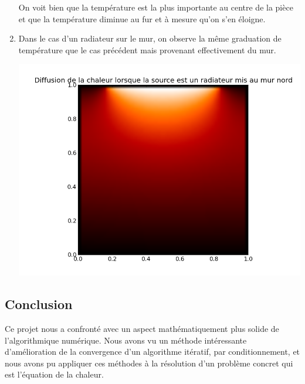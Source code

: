 \documentclass{article}
\begin{document}
\begin{enumerate}
On voit bien que la température est la plus importante au centre de la pièce et que la température diminue au fur et à mesure qu'on s'en éloigne.
\item Dans le cas d'un radiateur sur le mur, on observe la même graduation de température que le cas précédent mais provenant effectivement du mur.

\begin{center}
\includegraphics[scale=0.5]{wall.png}
\end{center}
\end{enumerate}

\subsection*{Conclusion}
Ce projet nous a confronté avec un aspect mathématiquement plus solide de l'algorithmique numérique. Nous avons vu un méthode intéressante d'amélioration de la convergence d'un algorithme itératif, par conditionnement, et nous avons pu appliquer ces méthodes à la résolution d'un problème concret qui est l'équation de la chaleur.
\end{document}
